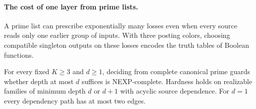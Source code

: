 \paragraph{The cost of one layer from prime lists.}
A prime list can prescribe exponentially many losses even when every
source reads only one earlier group of inputs. With three posting
colors, choosing compatible singleton outputs on these losses encodes
the truth tables of Boolean functions.

\begin{theorem}
\label{core:thm:succinct-layer-hardness}
For every fixed $K\ge3$ and $d\ge1$, deciding from complete canonical
prime guards whether depth at most $d$ suffices is NEXP-complete.
Hardness holds on realizable families of minimum depth $d$ or $d+1$
with acyclic source dependence. For $d=1$ every dependency path has
at most two edges.
\end{theorem}
